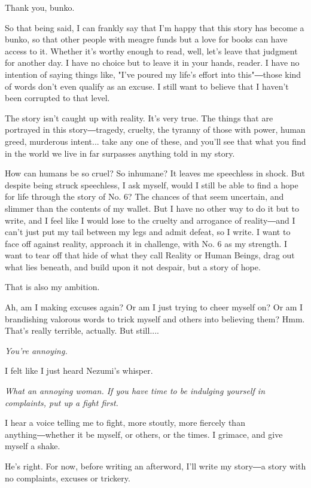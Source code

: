 Thank you, bunko.

So that being said, I can frankly say that I'm happy that this story has
become a bunko, so that other people with meagre funds but a love for
books can have access to it. Whether it's worthy enough to read, well,
let's leave that judgment for another day. I have no choice but to leave
it in your hands, reader. I have no intention of saying things like,
"I've poured my life's effort into this"―those kind of words don't even
qualify as an excuse. I still want to believe that I haven't been
corrupted to that level.

The story isn't caught up with reality. It's very true. The things that
are portrayed in this story―tragedy, cruelty, the tyranny of those with
power, human greed, murderous intent... take any one of these, and
you'll see that what you find in the world we live in far surpasses
anything told in my story.

How can humans be so cruel? So inhumane? It leaves me speechless in
shock. But despite being struck speechless, I ask myself, would I still
be able to find a hope for life through the story of No. 6? The chances
of that seem uncertain, and slimmer than the contents of my wallet. But
I have no other way to do it but to write, and I feel like I would lose
to the cruelty and arrogance of reality―and I can't just put my tail
between my legs and admit defeat, so I write. I want to face off against
reality, approach it in challenge, with No. 6 as my strength. I want to
tear off that hide of what they call Reality or Human Beings, drag out
what lies beneath, and build upon it not despair, but a story of hope.

That is also my ambition.

Ah, am I making excuses again? Or am I just trying to cheer myself on?
Or am I brandishing valorous words to trick myself and others into
believing them? Hmm. That's really terrible, actually. But still....

\emph{You're annoying.}

I felt like I just heard Nezumi's whisper.

\emph{What an annoying woman. If you have time to be indulging yourself
in complaints, put up a fight first.}

I hear a voice telling me to fight, more stoutly, more fiercely than
anything―whether it be myself, or others, or the times. I grimace, and
give myself a shake.

He's right. For now, before writing an afterword, I'll write my story―a
story with no complaints, excuses or trickery.

